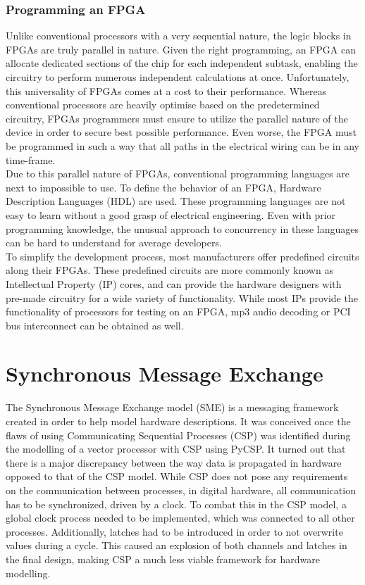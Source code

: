 \subsubsection{Programming an FPGA}
Unlike conventional processors with a very sequential nature, the logic blocks 
in FPGAs are truly parallel in nature. Given the right programming, an FPGA can
allocate dedicated sections of the chip for each independent subtask, enabling
the circuitry to perform numerous independent calculations at once\cite{ni_fpga}.
Unfortunately, this universality of FPGAs comes at a cost to their performance.
Whereas conventional processors are heavily optimise based on the predetermined 
circuitry, FPGAs programmers must ensure to utilize the parallel nature of the
device in order to secure best possible performance. Even worse, the FPGA must 
be programmed in such a way that all paths in the electrical wiring can be 
in any time-frame.\\
Due to this parallel nature of FPGAs, conventional programming languages are 
next to impossible to use. To define the behavior of an FPGA, Hardware 
Description Languages (HDL) are used. These programming languages are not easy
to learn without a good grasp of electrical engineering. Even with prior 
programming knowledge, the unusual approach to concurrency in these languages 
can be hard to understand for average developers.\\
To simplify the development process, most manufacturers offer predefined 
circuits along their FPGAs. These predefined circuits are more commonly known
as Intellectual Property (IP) cores, and can provide the hardware designers 
with pre-made circuitry for a wide variety of functionality. While most IPs 
provide the functionality of processors for testing on an FPGA, mp3 audio 
decoding or PCI bus interconnect can be obtained as well\cite{fpga_for_dummies}.



\section{Synchronous Message Exchange} 
The Synchronous Message Exchange
model (SME) is a messaging framework created in order to help model
hardware descriptions\cite{sme_for_hardware_designs}.  It was conceived
once the flaws of using Communicating Sequential Processes (CSP) was
identified during the modelling of a vector processor with CSP using
PyCSP\cite{PyCSP}.  It turned out that there is a major discrepancy
between the way data is propagated in hardware opposed to that of the
CSP model. While CSP does not pose any requirements on the communication
between processes, in digital hardware, all communication has to be
synchronized, driven by a clock. To combat this in the CSP model, a
global clock process needed to be implemented, which was connected to
all other processes. Additionally, latches had to be introduced in order
to not overwrite values during a cycle. This caused an explosion of both
channels and latches in the final design, making CSP a much less viable
framework for hardware modelling\cite{sme_for_hardware_designs}.

